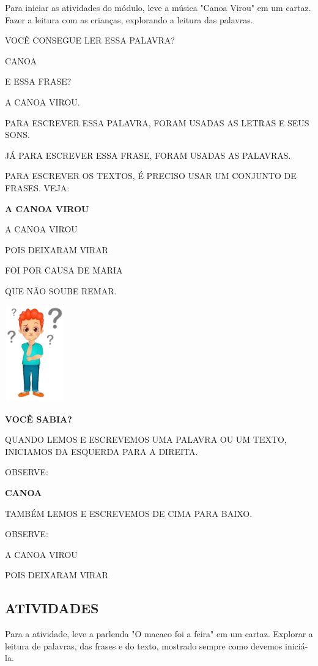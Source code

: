 \protect\hypertarget{_heading=h.4d34og8}{}{}Para iniciar as atividades
do módulo, leve a música "Canoa Virou" em um cartaz. Fazer a leitura com as
crianças, explorando a leitura das palavras. 

VOCÊ CONSEGUE LER ESSA PALAVRA?

CANOA

E ESSA FRASE?

A CANOA VIROU.

PARA ESCREVER ESSA PALAVRA, FORAM USADAS AS LETRAS E SEUS SONS.

JÁ PARA ESCREVER ESSA FRASE, FORAM USADAS AS PALAVRAS.

PARA ESCREVER OS TEXTOS, É PRECISO USAR UM CONJUNTO DE FRASES. VEJA:

\textbf{A CANOA VIROU}

A CANOA VIROU

POIS DEIXARAM VIRAR

FOI POR CAUSA DE MARIA

QUE NÃO SOUBE REMAR.

\includegraphics[width=1.02083in,height=1.63125in]{media/image85.jpg}

\protect\hypertarget{_heading=h.2s8eyo1}{}{}\textbf{VOCÊ SABIA?}

QUANDO LEMOS E ESCREVEMOS UMA PALAVRA OU UM TEXTO, INICIAMOS DA
ESQUERDA PARA A DIREITA.

OBSERVE:

\textbf{CANOA}

TAMBÉM LEMOS E ESCREVEMOS DE CIMA PARA BAIXO.

OBSERVE:

A CANOA VIROU

POIS DEIXARAM VIRAR

\subsection{ATIVIDADES}\label{atividades-1}

Para a atividade, leve a parlenda "O macaco foi a feira" em um
cartaz. Explorar a leitura de palavras, das frases e do texto, mostrado sempre como devemos iniciá-la.

